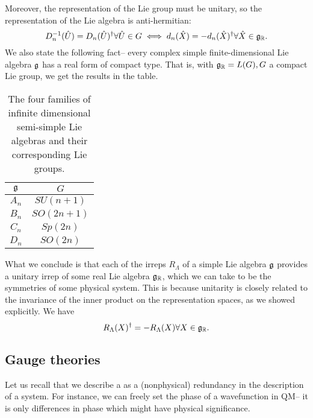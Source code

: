 Moreover, the representation of the Lie group must be unitary, so the representation of the Lie algebra is anti-hermitian:
$$D_n^{-1}(\hat U)=D_n(\hat U)^\dagger \forall \hat U \in G \iff d_n(\hat X)=-d_n (\hat X)^\dagger \forall \hat X \in \mathfrak{g}_{\mathbb{R}}.$$
We also state the following fact-- every complex simple finite-dimensional Lie algebra $\mathfrak{g}$ has a real form of compact type. That is, with $\mathfrak{g}_{\mathbb{R}}=L(G), G$ a compact Lie group, we get the results in the table.
\begin{table}[]
    \centering
    \begin{tabular}{c|c}
        $\mathfrak{g}$ & $G$ \\\hline
         $A_n$ & $SU(n+1)$  \\
         $B_n$ & $SO(2n+1)$ \\
         $C_n$ & $Sp(2n)$ \\
         $D_n$ & $SO(2n)$
    \end{tabular}
    \caption{The four families of infinite dimensional semi-simple Lie algebras and their corresponding Lie groups.}
    \label{tab:my_label}
\end{table}

What we conclude is that each of the irreps $R_\Lambda$ of a simple Lie algebra $\mathfrak{g}$ provides a unitary irrep of some real Lie algebra $\mathfrak{g}_{\mathbb{R}}$, which we can take to be the symmetries of some physical system. This is because unitarity is closely related to the invariance of the inner product on the representation spaces, as we showed explicitly. We have
$$R_\Lambda(X)^\dagger = - R_\Lambda(X) \forall X\in \mathfrak{g}_{\mathbb{R}}.$$

\subsection*{Gauge theories} Let us recall that we describe a  as a (nonphysical) redundancy in the description of a system. For instance, we can freely set the phase of a wavefunction in QM-- it is only differences in phase which might have physical significance.

